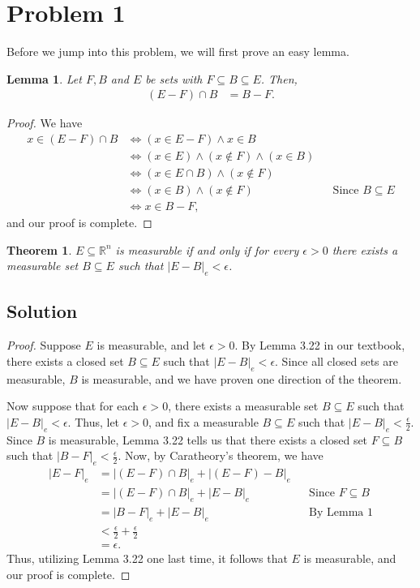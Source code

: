 \documentclass[10pt,a4paper]{article}
\author{Jeremiah Givens}
\theoremstyle{theorem}
\newtheorem{theorem}{Theorem}
\newtheorem{lemma}{Lemma}
\theoremstyle{definition}
\begin{document}
\section*{Problem 1}
Before we jump into this problem, we will first prove an easy lemma.
\begin{lemma}
Let $F, B $ and $E$ be sets with $F \subseteq B \subseteq E$. Then, 
\begin{align*}
(E - F) \cap B &= B - F.
\end{align*}
\end{lemma}

\begin{proof}
We have
\begin{align*}
x \in (E - F) \cap B &\iff (x \in E - F) \land x \in B\\
&\iff (x \in E) \land (x \not \in F) \land (x \in B)\\
&\iff (x \in E \cap B) \land (x \not \in F)\\
&\iff (x \in B) \land (x \not \in F) &&\text{Since } B \subseteq E\\
&\iff x \in B - F,
\end{align*}
and our proof is complete.
\end{proof}

\begin{theorem}
$E \subseteq \mathbb{R}^n$ is measurable if and only if for every $\epsilon >0$ there exists a measurable set $B \subseteq	E$ such that $|E - B|_e < \epsilon$.
\end{theorem}

\subsection*{Solution}
\begin{proof}
Suppose $E$ is measurable, and let $\epsilon >0$. By Lemma 3.22 in our textbook,  there exists a closed set $B \subseteq E$ such that $|E - B|_e < \epsilon$.  Since all closed sets are measurable, $B$ is measurable, and we have proven one direction of the theorem.

Now suppose that for each $\epsilon > 0$,  there exists a measurable set $B \subseteq	E$ such that $|E - B|_e < \epsilon$.  Thus, let $\epsilon > 0$, and fix a measurable $B \subseteq	E$ such that $|E - B|_e < \frac{\epsilon}{2}.$ Since $B$ is measurable, Lemma 3.22 tells us that there exists a closed set $F \subseteq B$ such that $|B - F|_e < \frac{\epsilon}{2}$. Now, by Caratheory's theorem, we have
\begin{align*}
|E - F|_e &= |(E - F) \cap B|_e + |(E - F) - B|_e\\
&= |(E - F) \cap B|_e + |E - B|_e && \text{Since } F \subseteq B\\
&= |B - F|_e + |E - B|_e && \text{By Lemma 1}\\
&< \frac{\epsilon}{2} + \frac{\epsilon}{2}\\
&= \epsilon.
\end{align*}
Thus, utilizing Lemma 3.22 one last time, it follows that $E$ is measurable, and our proof is complete.
\end{proof}
\end{document}
